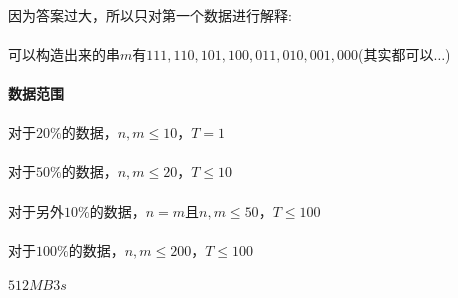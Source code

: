 \documentclass[UTF8]{ctexart}
\begin{document}
\paragraph{}因为答案过大，所以只对第一个数据进行解释:
\paragraph{}可以构造出来的串$m$有$111,110,101,100,011,010,001,000$(其实都可以$\dots$)
\paragraph{数据范围}
\paragraph{}对于$20\%$的数据，$n,m\leq 10$，$T=1$
\paragraph{}对于$50\%$的数据，$n,m\leq 20$，$T\leq 10$
\paragraph{}对于另外$10\%$的数据，$n=m$且$n,m\leq 50$，$T\leq 100$
\paragraph{}对于$100\%$的数据，$n,m\leq 200$，$T\leq 100$
\paragraph{}$512MB3s$
\end{document}
